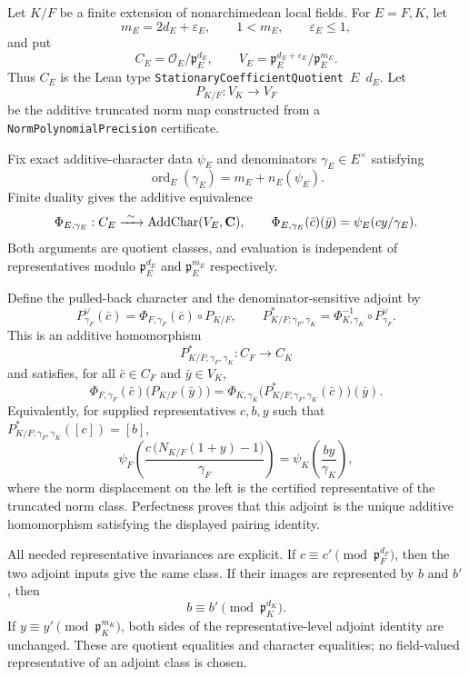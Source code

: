 \begin{definition}\label{mod:parameters-adjoint}
Let $K/F$ be a finite extension of nonarchimedean local fields.  For
$E=F,K$, let
\[
 m_E=2d_E+\varepsilon_E,\qquad
 1<m_E,\qquad \varepsilon_E\leq1,
\]
and put
\[
 C_E=\mathcal O_E/\mathfrak p_E^{d_E},
 \qquad
 V_E=\mathfrak p_E^{d_E+\varepsilon_E}/\mathfrak p_E^{m_E}.
\]
Thus $C_E$ is the Lean type
\texttt{StationaryCoefficientQuotient $E$ $d_E$}.  Let
\[
 P_{K/F}:V_K\longrightarrow V_F
\]
be the additive truncated norm map constructed from a
\texttt{NormPolynomialPrecision} certificate.

Fix exact additive-character data $\psi_E$ and denominators
$\gamma_E\in E^\times$ satisfying
\[
 \operatorname{ord}_E(\gamma_E)=m_E+n_E(\psi_E).
\]
Finite duality gives the additive equivalence
\[
 \Phi_{E,\gamma_E}:C_E\xrightarrow{\ \sim\ }
   \operatorname{AddChar}(V_E,\mathbf C),
 \qquad
 \Phi_{E,\gamma_E}(\bar c)(\bar y)
   =\psi_E(cy/\gamma_E).
\]
Both arguments are quotient classes, and evaluation is independent of
representatives modulo $\mathfrak p_E^{d_E}$ and
$\mathfrak p_E^{m_E}$ respectively.

Define the pulled-back character and the denominator-sensitive adjoint by
\[
 P^\vee_{\gamma_F}(\bar c)
   =\Phi_{F,\gamma_F}(\bar c)\circ P_{K/F},
 \qquad
 P^*_{K/F;\gamma_F,\gamma_K}
   =\Phi_{K,\gamma_K}^{-1}\circ P^\vee_{\gamma_F}.
\]
This is an additive homomorphism
\[
 P^*_{K/F;\gamma_F,\gamma_K}:C_F\longrightarrow C_K
\]
and satisfies, for all $\bar c\in C_F$ and $\bar y\in V_K$,
\[
 \Phi_{F,\gamma_F}(\bar c)\bigl(P_{K/F}(\bar y)\bigr)
 =
 \Phi_{K,\gamma_K}
   \bigl(P^*_{K/F;\gamma_F,\gamma_K}(\bar c)\bigr)(\bar y).
\]
Equivalently, for supplied representatives $c,b,y$ such that
$P^*_{K/F;\gamma_F,\gamma_K}([c])=[b]$,
\[
 \psi_F\!\left(
   \frac{c\,\bigl(N_{K/F}(1+y)-1\bigr)}{\gamma_F}\right)
 =
 \psi_K\!\left(\frac{by}{\gamma_K}\right),
\]
where the norm displacement on the left is the certified representative
of the truncated norm class.  Perfectness proves that this adjoint is the
unique additive homomorphism satisfying the displayed pairing identity.

All needed representative invariances are explicit.  If
$c\equiv c'\pmod{\mathfrak p_F^{d_F}}$, then the two adjoint inputs give
the same class.  If their images are represented by $b$ and $b'$, then
\[
 b\equiv b'\pmod{\mathfrak p_K^{d_K}}.
\]
If $y\equiv y'\pmod{\mathfrak p_K^{m_K}}$, both sides of the
representative-level adjoint identity are unchanged.  These are quotient
equalities and character equalities; no field-valued representative of an
adjoint class is chosen.


\end{definition}
